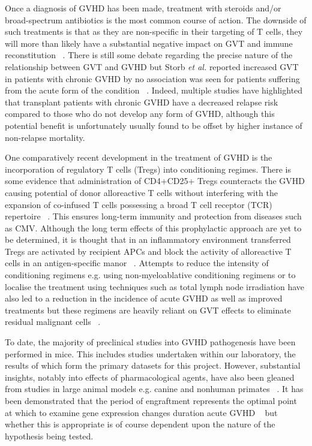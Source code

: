 Once a diagnosis of GVHD has been made, treatment with steroids and/or broad-spectrum antibiotics is the most common course of action. The downside of such treatments is that as they are non-specific in their targeting of T cells, they will more than likely have a substantial negative impact on GVT and immune reconstitution ~\autocite{Bla2012}. There is still some debate regarding the precise nature of the relationship between GVT and GVHD but Storb \textit{et al.} reported increased GVT in patients with chronic GVHD by no association was seen for patients suffering from the acute form of the condition ~\autocite{Sto2013}. Indeed, multiple studies have highlighted that transplant patients with chronic GVHD have a decreased relapse risk compared to those who do not develop any form of GVHD, although this potential benefit is unfortunately usually found to be offset by higher instance of non-relapse mortality.

One comparatively recent development in the treatment of GVHD is the incorporation of regulatory T cells (Tregs) into conditioning regimes. There is some evidence that administration of CD4+CD25+ Tregs counteracts the GVHD causing potential of donor alloreactive T cells without interfering with the expansion of co-infused T cells possessing a broad T cell receptor (TCR) repertoire ~\autocite{Ian2015}. This ensures long-term immunity and protection from diseases such as CMV. Although the long term effects of this prophylactic approach are yet to be determined, it is thought that in an inflammatory environment transferred Tregs are activated by recipient APCs and block the activity of alloreactive T cells in an antigen-specific manor ~\autocite{Ian2015}. Attempts to reduce the intensity of conditioning regimens e.g. using non-myeloablative conditioning regimens or to localise the treatment using techniques such as total lymph node irradiation have also led to a reduction in the incidence of acute GVHD as well as improved treatments but these regimens are heavily reliant on GVT effects to eliminate residual malignant cells ~\autocite{Bla2012}.

To date, the majority of preclinical studies into GVHD pathogenesis have been performed in mice. This includes studies undertaken within our laboratory, the results of which form the primary datasets for this project. However, substantial insights, notably into effects of pharmacological agents, have also been gleaned from studies in large animal models e.g. canine and nonhuman primates ~\autocite{Bla2012}. It has been demonstrated that the period of engraftment represents the optimal point at which to examine gene expression changes duration acute GVHD ~\autocite{Buz2008} but whether this is appropriate is of course dependent upon the nature of the hypothesis being tested. 

